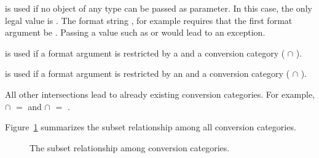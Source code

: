 \begin{description}
\item{} is used if no object of any type can be
    passed as parameter. In this case, the only legal value is .
    The format string , for example requires that the first
    format argument be .  Passing a value such as  or
     would lead to an exception.
\item{} is used if a format argument is restricted by a  and a  conversion category ( $\cap$ ).
\item{} is used if a format argument is restricted by an  and a  conversion category ( $\cap$ ).
\end{description}

\noindent All other intersections lead to already existing conversion categories.
For example,  $\cap$  $=$  and
 $\cap$  $=$ .

Figure~\ref{fig-formatter-cat} summarizes the subset
relationship among all conversion categories.

\begin{figure}[thbp]
    \caption{The subset relationship
        among conversion categories.}
    \label{fig-formatter-cat}
\end{figure}



%

